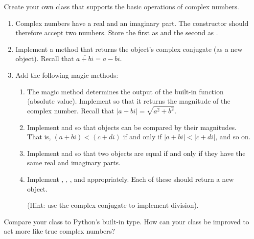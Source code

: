 \begin{problem}
Create your own  class that supports the basic operations of complex numbers.
\begin{enumerate}
\item Complex numbers have a real and an imaginary part. The constructor should therefore accept two numbers. Store the first as  and the second as .
\item Implement a  method that returns the object's complex conjugate (as a new  object). Recall that $\overline{a + bi} = a - bi$.
\item Add the following magic methods:
\begin{enumerate}
\item The  magic method determines the output of the built-in  function (absolute value). Implement  so that it returns the magnitude of the complex number. Recall that $|a+bi| = \sqrt{a^2+b^2}$.
\item Implement  and  so that  objects can be compared by their magnitudes. That is, $(a+bi) < (c+di)$ if and only if $|a+bi| < |c+di|$, and so on.
\item Implement  and  so that two  objects are equal if and only if they have the same real and imaginary parts.
\item Implement , , , and  appropriately.
Each of these should return a new  object.

(Hint: use the complex conjugate to implement division).
\end{enumerate}
\end{enumerate}
Compare your class to Python's built-in  type.
How can your class be improved to act more like true complex numbers?
\end{problem}

